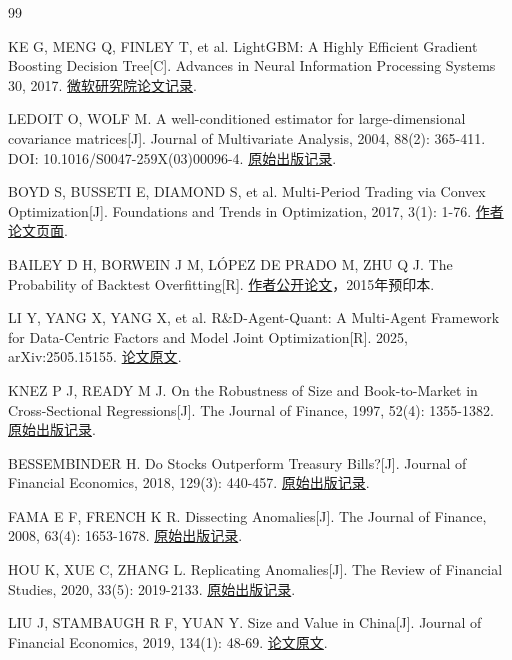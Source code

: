 \documentclass[UTF8,12pt,a4paper,fontset=none]{ctexart}
\begin{document}
\begin{thebibliography}{99}\small\raggedright\setlength{\itemsep}{.4em}
 KE G, MENG Q, FINLEY T, et al. LightGBM: A Highly Efficient Gradient Boosting Decision Tree[C]. Advances in Neural Information Processing Systems 30, 2017. \href{https://www.microsoft.com/en-us/research/project/lightgbm/publications/}{微软研究院论文记录}.

 LEDOIT O, WOLF M. A well-conditioned estimator for large-dimensional covariance matrices[J]. Journal of Multivariate Analysis, 2004, 88(2): 365-411. DOI: 10.1016/S0047-259X(03)00096-4. \href{https://doi.org/10.1016/S0047-259X(03)00096-4}{原始出版记录}.

 BOYD S, BUSSETI E, DIAMOND S, et al. Multi-Period Trading via Convex Optimization[J]. Foundations and Trends in Optimization, 2017, 3(1): 1-76. \href{https://web.stanford.edu/~boyd/papers/cvx_portfolio.html}{作者论文页面}.

 BAILEY D H, BORWEIN J M, LÓPEZ DE PRADO M, ZHU Q J. The Probability of Backtest Overfitting[R]. \href{https://www.davidhbailey.com/dhbpapers/backtest-prob.pdf}{作者公开论文}，2015年预印本.

 LI Y, YANG X, YANG X, et al. R\&D-Agent-Quant: A Multi-Agent Framework for Data-Centric Factors and Model Joint Optimization[R]. 2025, arXiv:2505.15155. \href{https://arxiv.org/abs/2505.15155}{论文原文}.

 KNEZ P J, READY M J. On the Robustness of Size and Book-to-Market in Cross-Sectional Regressions[J]. The Journal of Finance, 1997, 52(4): 1355-1382. \href{https://doi.org/10.1111/j.1540-6261.1997.tb01113.x}{原始出版记录}.

 BESSEMBINDER H. Do Stocks Outperform Treasury Bills?[J]. Journal of Financial Economics, 2018, 129(3): 440-457. \href{https://doi.org/10.1016/j.jfineco.2018.06.004}{原始出版记录}.

 FAMA E F, FRENCH K R. Dissecting Anomalies[J]. The Journal of Finance, 2008, 63(4): 1653-1678. \href{https://doi.org/10.1111/j.1540-6261.2008.01371.x}{原始出版记录}.

 HOU K, XUE C, ZHANG L. Replicating Anomalies[J]. The Review of Financial Studies, 2020, 33(5): 2019-2133. \href{https://doi.org/10.1093/rfs/hhy131}{原始出版记录}.

 LIU J, STAMBAUGH R F, YUAN Y. Size and Value in China[J]. Journal of Financial Economics, 2019, 134(1): 48-69. \href{https://www.mingshiim.com/static/sizevaluechina.pdf}{论文原文}.


\end{thebibliography}
\end{document}
